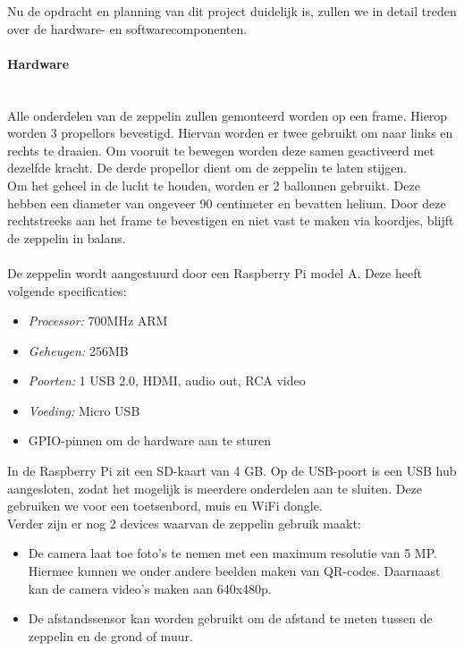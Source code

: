 \documentclass{peno-opdracht2}
\begin{document}
\maketitle

Nu de opdracht en planning van dit project duidelijk is, zullen we in detail treden over de hardware- en softwarecomponenten. 
\paragraph{Hardware} ~\\
Alle onderdelen van de zeppelin zullen gemonteerd worden op een frame. Hierop worden 3 propellors bevestigd. Hiervan worden er twee gebruikt om naar links en rechts te draaien. Om vooruit te bewegen worden deze samen geactiveerd met dezelfde kracht. De derde propellor dient om de zeppelin te laten stijgen. ~\\

Om het geheel in de lucht te houden, worden er 2 ballonnen gebruikt. Deze hebben een diameter van ongeveer 90 centimeter en bevatten helium. Door deze rechtstreeks aan het frame te bevestigen en niet vast te maken via koordjes, blijft de zeppelin in balans.\\
\\
De zeppelin wordt aangestuurd door een Raspberry Pi model A. Deze heeft volgende specificaties: 
\begin{itemize}
	\item \emph{Processor:} 700MHz ARM
	\item \emph{Geheugen:} 256MB 
	\item \emph{Poorten:} 1 USB 2.0, HDMI, audio out, RCA video
	\item \emph{Voeding:} Micro USB
	\item GPIO-pinnen om de hardware aan te sturen
\end{itemize}

In de Raspberry Pi zit een SD-kaart van 4 GB. Op de USB-poort is een USB hub aangesloten, zodat het mogelijk is meerdere onderdelen aan te sluiten. Deze gebruiken we voor een toetsenbord, muis en WiFi dongle. \\

Verder zijn er nog 2 devices waarvan de zeppelin gebruik maakt:
\begin{itemize}
	\item De camera laat toe foto's te nemen met een maximum resolutie van 5 MP. Hiermee kunnen we onder andere beelden maken van QR-codes. Daarnaast kan de camera video's maken aan 640x480p. 
	\item De afstandssensor kan worden gebruikt om de afstand te meten tussen de zeppelin en de grond of muur.\\
\end{itemize} ~\\
\end{document}
